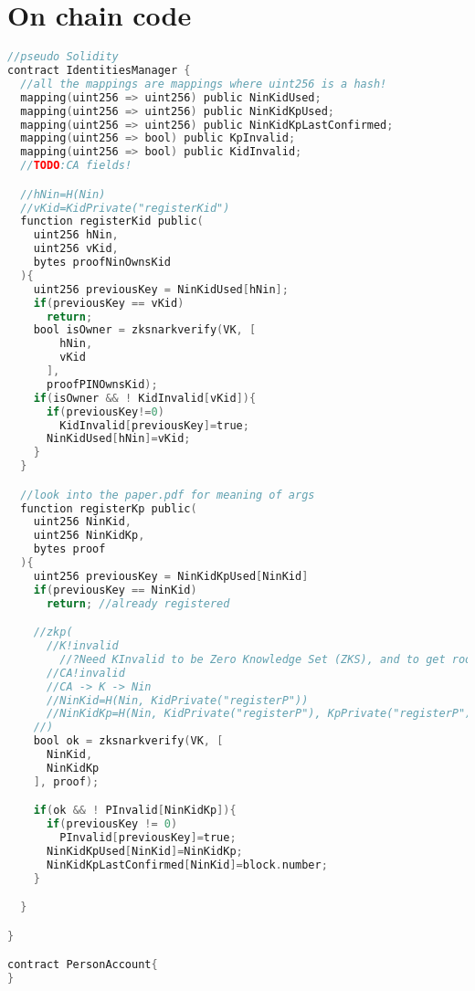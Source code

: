 \documentclass{article}
\begin{document}
\section{On chain code}
\begin{lstlisting}[language=C, frame=single, style=b]
//pseudo Solidity
contract IdentitiesManager {
  //all the mappings are mappings where uint256 is a hash!
  mapping(uint256 => uint256) public NinKidUsed;
  mapping(uint256 => uint256) public NinKidKpUsed;
  mapping(uint256 => uint256) public NinKidKpLastConfirmed;
  mapping(uint256 => bool) public KpInvalid;
  mapping(uint256 => bool) public KidInvalid;
  //TODO:CA fields!

  //hNin=H(Nin)
  //vKid=KidPrivate("registerKid")
  function registerKid public(
    uint256 hNin,
    uint256 vKid,
    bytes proofNinOwnsKid
  ){
    uint256 previousKey = NinKidUsed[hNin];
    if(previousKey == vKid)
      return;
    bool isOwner = zksnarkverify(VK, [
        hNin, 
        vKid
      ],
      proofPINOwnsKid);
    if(isOwner && ! KidInvalid[vKid]){
      if(previousKey!=0)
        KidInvalid[previousKey]=true;
      NinKidUsed[hNin]=vKid;
    }
  }

  //look into the paper.pdf for meaning of args
  function registerKp public(
    uint256 NinKid,
    uint256 NinKidKp,
    bytes proof
  ){
    uint256 previousKey = NinKidKpUsed[NinKid]
    if(previousKey == NinKid)
      return; //already registered

    //zkp(
      //K!invalid
        //?Need KInvalid to be Zero Knowledge Set (ZKS), and to get roots
      //CA!invalid
      //CA -> K -> Nin
      //NinKid=H(Nin, KidPrivate("registerP"))
      //NinKidKp=H(Nin, KidPrivate("registerP"), KpPrivate("registerP"))
    //)
    bool ok = zksnarkverify(VK, [
      NinKid,
      NinKidKp
    ], proof);

    if(ok && ! PInvalid[NinKidKp]){
      if(previousKey != 0)
        PInvalid[previousKey]=true;
      NinKidKpUsed[NinKid]=NinKidKp;
      NinKidKpLastConfirmed[NinKid]=block.number;
    }

  }

}

contract PersonAccount{
}
\end{lstlisting}

\newpage
\end{document}
